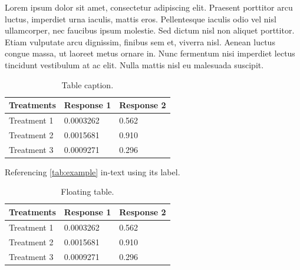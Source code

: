 \documentclass[
	11pt,
	fleqn,
	a4paper,
]{LegrandOrangeBook}
\begin{document}
Lorem ipsum dolor sit amet, consectetur adipiscing elit. Praesent porttitor arcu luctus, imperdiet urna iaculis, mattis eros. Pellentesque iaculis odio vel nisl ullamcorper, nec faucibus ipsum molestie. Sed dictum nisl non aliquet porttitor. Etiam vulputate arcu dignissim, finibus sem et, viverra nisl. Aenean luctus congue massa, ut laoreet metus ornare in. Nunc fermentum nisi imperdiet lectus tincidunt vestibulum at ac elit. Nulla mattis nisl eu malesuada suscipit.

\begin{table}[H] %
    \centering %
    \begin{tabular}{L{0.15\textwidth} R{0.15\textwidth} R{0.15\textwidth}} %
        \toprule
        \textbf{Treatments} & \textbf{Response 1} & \textbf{Response 2} \\
        \midrule
        Treatment 1         & 0.0003262           & 0.562               \\
        Treatment 2         & 0.0015681           & 0.910               \\
        Treatment 3         & 0.0009271           & 0.296               \\
        \bottomrule
    \end{tabular}
    \caption{Table caption.}
    \label{tab:example} %
\end{table}

Referencing \autoref{tab:example} in-text using its label.

\begin{table}[t] %
    \centering %
    \begin{tabular}{L{0.15\textwidth} R{0.15\textwidth} R{0.15\textwidth}} %
        \toprule
        \textbf{Treatments} & \textbf{Response 1} & \textbf{Response 2} \\
        \midrule
        Treatment 1         & 0.0003262           & 0.562               \\
        Treatment 2         & 0.0015681           & 0.910               \\
        Treatment 3         & 0.0009271           & 0.296               \\
        \bottomrule
    \end{tabular}
    \caption{Floating table.}
    \label{tab:floating} %
\end{table}
\end{document}

